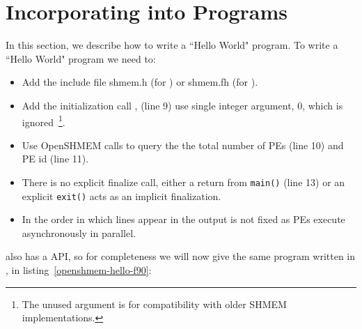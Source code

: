 \section*{Incorporating \openshmem{} into Programs}

In this section, we describe how to write a ``Hello World" \openshmem program.
To write a ``Hello World" \openshmem program we need to\cbstart : \cbend

\begin{itemize}
\item Add the include file shmem.h (for \Clang) or shmem.fh (for \Fortran).
\item Add the initialization call , (line 9) use
  single integer argument, 0, which is ignored~\footnote{The unused
    argument is for compatibility with older SHMEM implementations.}.
\item Use OpenSHMEM calls to query the the total number of PEs (line 10) and PE id (line 11).
\item There is no explicit finalize call, either a return from
  \texttt{main()} (line 13) or an explicit \texttt{exit()} acts as an
  implicit \openshmem finalization.
\item In \openshmem the order in which lines appear
  in the output is not fixed as \ac{PE}s execute asynchronously in parallel.
\end{itemize}

\begin{minipage}{\linewidth}
\vspace{0.1in}
\vspace{0.1in}
\end{minipage}

\openshmem also has a \Fortran{} API, so for completeness we will now give the
same program written in \Fortran, in listing~\ref{openshmem-hello-f90}:

\begin{minipage}{\linewidth}
\vspace{0.1in}
\vspace{0.1in}
\end{minipage}

